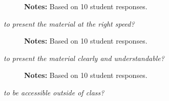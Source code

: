\begin{boenumerate}
\begin{itemize}
\begin{figure}[h!]\centering
{}\hspace{0.5cm}
\begin{center}
\begin{minipage}[t]{0.85\columnwidth}\vspace{-0.75cm}
\item\scriptsize{\textbf{Notes:} Based on 10 student responses.}
\end{minipage}
\end{center}
\end{figure}
\FloatBarrier
\newpage
\item \textit{to present the material at the right speed?}

\begin{figure}[h!]\centering
{}\hspace{0.5cm}
\begin{center}
\begin{minipage}[t]{0.85\columnwidth}\vspace{-0.75cm}
\item\scriptsize{\textbf{Notes:} Based on 10 student responses.}
\end{minipage}
\end{center}
\end{figure}
\FloatBarrier
\item \textit{to present the material clearly and understandable?}

\begin{figure}[h!]\centering
{}\hspace{0.75cm}
\begin{center}
\begin{minipage}[t]{0.85\columnwidth}\vspace{-0.75cm}
\item\scriptsize{\textbf{Notes:} Based on 10 student responses.}
\end{minipage}
\end{center}
\end{figure}
\FloatBarrier
\newpage
\item \textit{to be accessible outside of class?}


\end{itemize}
\end{boenumerate}
